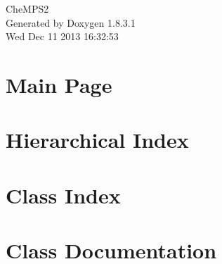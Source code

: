 \documentclass{article}
\begin{document}
\hypersetup{pageanchor=false,citecolor=blue}
\begin{titlepage}
\vspace*{7cm}
\begin{center}
{\Large Che\-M\-P\-S2 }\\
\vspace*{1cm}
{\large Generated by Doxygen 1.8.3.1}\\
\vspace*{0.5cm}
{\small Wed Dec 11 2013 16:32:53}\\
\end{center}
\end{titlepage}
\tableofcontents
{}
\hypersetup{pageanchor=true,citecolor=blue}
\section{Main Page}
\label{index}\hypertarget{index}{}
\section{Hierarchical Index}

\section{Class Index}

\section{Class Documentation}
































\printindex
\end{document}
